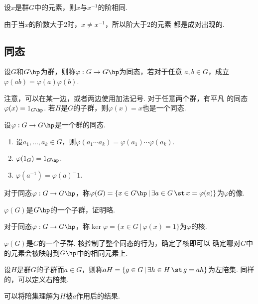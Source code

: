   \begin{pos}[逆元的阶]
    \label{pos: 逆元的阶}
    设$x$是群$G$中的元素，则$x$与$x^{-1}$的阶相同.
  \end{pos}
  \remark
    由于当$x$的阶数大于$2$时，$x\ne x^{-1}$，所以阶大于$2$的元素
    都是成对出现的.

\subsection{同态}

  \begin{defi}
    设$G$和$G\hp$为群，则称$\varphi:G\to G\hp$为同态，若对于任意
    $a, b\in G$，成立$\varphi(ab) = \varphi(a)\varphi(b)$.
  \end{defi}
  \remark
    注意，可以在某一边，或者两边使用加法记号. 对于任意两个群，有平凡
    的同态$\varphi(x) = 1_{G\hp}$. 若$H$是$G$的子群，则$\varphi(x)
    =x$也是一个同态.

  \begin{thm}
    设$\varphi: G\to G\hp$是一个群的同态.
    \begin{enumerate}
      \item 设$a_1,\dots, a_k\in G$，则$\varphi(a_1\cdots a_k)
        =\varphi(a_1)\cdots\varphi(a_k)$.
      \item $\varphi(1_G) = 1_{G\hp}$.
      \item $\varphi(a^{-1}) = \varphi(a)^-1$.
    \end{enumerate}
  \end{thm}

  \begin{defi}[像]
    对于同态$\varphi:G\to G\hp$，称$\varphi(G) = \{x\in G\hp\,|\,
    \exists a\in G \,\st\, x=\varphi(a)\}$为$\varphi$的像.
  \end{defi}
  \remark
    $\varphi(G)$是$G\hp$的一个子群，证明略.

  \begin{defi}[核]
    对于同态$\varphi:G\to G\hp$，称$\ker\varphi = \{x\in G\,|\,
    \varphi(x)=1\}$为$\varphi$的核.
  \end{defi}
  \remark
    $\varphi(G)$是$G$的一个子群. 核控制了整个同态的行为，确定了核即可以
    确定哪对$G$中的元素会被映射到$G\hp$中的相同元素上.

  \begin{defi}[陪集]
    \label{defi: 陪集}
    设$H$是群$G$的子群而$a\in G$，则称$aH=\{g\in G\,|\,
    \exists h\in H\,\st\, g=ah\}$为左陪集. 同样的，可以定义右陪集.
  \end{defi}
  \remark
    可以将陪集理解为$H$被$a$作用后的结果.


